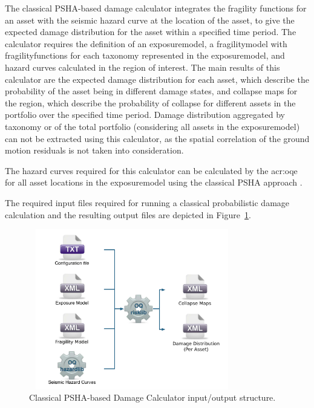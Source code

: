 The classical PSHA-based damage calculator integrates the fragility functions
for an asset with the seismic hazard curve at the location of the asset, to
give the expected damage distribution for the asset within a specified time
period. The calculator requires the definition of an \gls{exposuremodel}, a
\gls{fragilitymodel} with  \glspl{fragilityfunction} for each taxonomy
represented in the \gls{exposuremodel}, and hazard curves calculated in the
region of interest. The main results of this calculator are the expected
damage distribution for each asset, which describe the probability of the
asset being in different damage states, and collapse maps for the region,
which describe the probability of collapse for different assets in the
portfolio over the specified time period. Damage distribution aggregated by
taxonomy or of the total portfolio (considering all assets in the
\gls{exposuremodel}) can not be extracted using this calculator, as the
spatial correlation of the ground motion residuals is not taken into
consideration.

The hazard curves required for this calculator can be calculated by the
\glsdesc{acr:oqe} for all asset locations in the \gls{exposuremodel} using the
classical PSHA approach \citep{cornell1968, mcguire1976}.

The required input files required for running a classical probabilistic damage
calculation and the resulting output files are depicted in Figure~\ref{fig:io-structure-classical-damage}.

\begin{figure}[ht]
\centering
\includegraphics[width=9cm,height=7cm]{figures/risk/io-structure-classical-damage.pdf}
\caption{Classical PSHA-based Damage Calculator input/output structure.}
\label{fig:io-structure-classical-damage}
\end{figure}